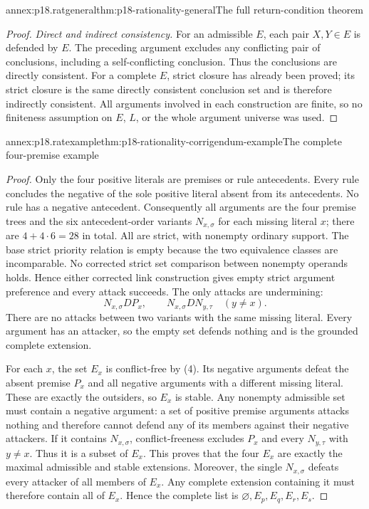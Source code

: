 \begin{annexitem}{annex:p18.ratgeneral}{thm:p18-rationality-general}{The full return-condition theorem}
\begin{proof}
\emph{Direct and indirect consistency.}
For an admissible \(E\), each pair \(X,Y\in E\) is defended by \(E\).
The preceding argument excludes any conflicting pair of conclusions,
including a self-conflicting conclusion. Thus the conclusions are
directly consistent.
For a complete \(E\), strict closure has already been proved; its
strict closure is the same directly consistent conclusion set and
is therefore indirectly consistent.
All arguments involved in each construction are finite, so no finiteness
assumption on \(E\), \(L\), or the whole argument universe was used.
\end{proof}
\end{annexitem}

\begin{annexitem}{annex:p18.ratexample}{thm:p18-rationality-corrigendum-example}{The complete four-premise example}
\begin{proof}
Only the four positive literals are premises or rule antecedents.
Every rule concludes the negative of the sole positive literal absent
from its antecedents. No rule has a negative antecedent.
Consequently all arguments are the four premise trees and the six
antecedent-order variants \(N_{x,\sigma}\) for each missing literal \(x\);
there are \(4+4\cdot6=28\) in total.
All are strict, with nonempty ordinary support.
The base strict priority relation is empty because the two equivalence
classes are incomparable. No corrected strict set comparison between
nonempty operands holds. Hence either corrected link construction gives
empty strict argument preference and every attack succeeds.
The only attacks are undermining:
\[
 N_{x,\sigma} D P_x,\qquad
 N_{x,\sigma} D N_{y,\tau}\quad (y\ne x).
 \tag{4}
\]
There are no attacks between two variants with the same missing literal.
Every argument has an attacker, so the empty set defends nothing and
is the grounded complete extension.

For each \(x\), the set \(E_x\) is conflict-free by (4).
Its negative arguments defeat the absent premise \(P_x\) and all
negative arguments with a different missing literal. These are exactly
the outsiders, so \(E_x\) is stable.
Any nonempty admissible set must contain a negative argument:
a set of positive premise arguments attacks nothing and therefore cannot
defend any of its members against their negative attackers.
If it contains \(N_{x,\sigma}\), conflict-freeness excludes \(P_x\)
and every \(N_{y,\tau}\) with \(y\ne x\). Thus it is a subset of \(E_x\).
This proves that the four \(E_x\) are exactly the maximal admissible
and stable extensions.
Moreover, the single \(N_{x,\sigma}\) defeats every attacker of all
members of \(E_x\). Any complete extension containing it must therefore
contain all of \(E_x\). Hence the complete list is
\(\varnothing,E_p,E_q,E_r,E_s\).


\end{proof}
\end{annexitem}
